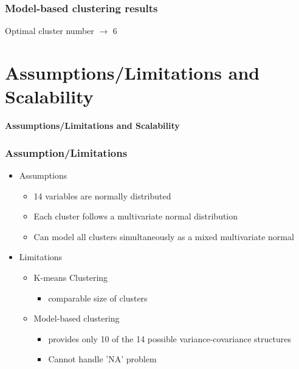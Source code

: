 \documentclass{beamer}
\begin{document}
\begin{frame}
\frametitle{Model-based clustering results}
Optimal cluster number $\rightarrow$ 6 \\
\begin{center}
\end{center}
\end{frame}





















\section{Assumptions/Limitations and Scalability}
\begin{frame}
\begin{center}
\textbf{Assumptions/Limitations and Scalability}
\end{center} 
\end{frame}


\begin{frame}
\frametitle{Assumption/Limitations}
\begin{itemize}
\item Assumptions
\begin{itemize}
\item 14 variables are normally distributed
\item Each cluster follows a multivariate normal distribution 
\item Can model all clusters simultaneously as a mixed multivariate normal
\end{itemize}
\item Limitations
\begin{itemize}
\item K-means Clustering
\begin{itemize}
\item comparable size of clusters
\end{itemize}
\item Model-based clustering
\begin{itemize}
\item provides only 10 of the 14 possible variance-covariance structures
\item Cannot handle 'NA' problem
\end{itemize}

\end{itemize}


\end{itemize}
\end{frame}
\end{document}
